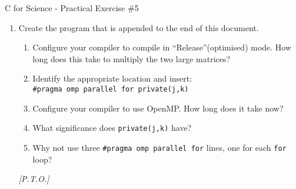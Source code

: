 \documentclass[a4paper,12pt]{article}
\begin{document}
\begin{center}
\large C for Science - Practical Exercise \#5
\end{center}

\begin{enumerate}
\item Create the program that is appended to the end of this document.
\begin{enumerate}
\item Configure your compiler to compile in ``Release''(optimised) mode. How long does this take to multiply the two large matrices?
\item Identify the appropriate location and insert:\\
\texttt{\#pragma omp parallel for private(j,k)}\\
\item Configure your compiler to use OpenMP. How long does it take now?
\item What significance does \texttt{private(j,k)} have?
\item Why not use three \texttt{\#pragma omp parallel for} lines, one for each \texttt{for} loop?
\end{enumerate}
\begin{flushright}\textit{[P.T.O.]}\end{flushright}
\newpage


\end{enumerate}
\end{document}
